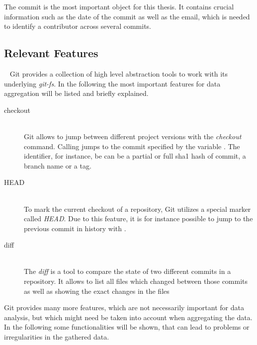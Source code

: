 The commit is the most important object for this thesis.
It contains crucial information such as the date of the commit as well as the email, which is needed to identify a contributor across several commits.

\subsection{Relevant Features}~\label{git-features}
Git provides a collection of high level abstraction tools to work with its underlying \emph{git-fs}.
In the following the most important features for data aggregation will be listed and briefly explained.

\begin{description}
    \item[checkout] \hfill \\
        Git allows to jump between different project versions with the \emph{checkout} command.
        Calling  jumps to the commit specified by the variable .
        The identifier, for instance, be can be a partial or full \ac{sha1} hash of commit, a branch name or a tag.

    \item[HEAD] \hfill \\
        To mark the current checkout of a repository, Git utilizes a special marker called \emph{HEAD}.
        Due to this feature, it is for instance possible to jump to the previous commit in history with .

    \item[diff] \hfill \\
        The \emph{diff} is a tool to compare the state of two different commits in a repository.
        It allows to list all files which changed between those commits as well as showing the exact changes in the files

\end{description}

Git provides many more features, which are not necessarily important for data analysis, but which might need be taken into account when aggregating the data.
In the following some functionalities will be shown, that can lead to problems or irregularities in the gathered data.

